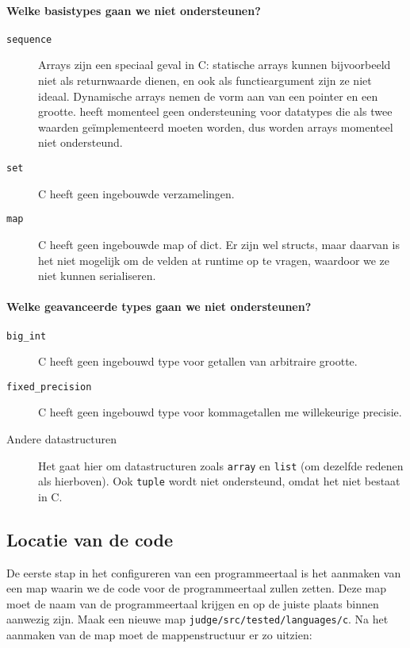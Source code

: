 \paragraph{Welke basistypes gaan we niet ondersteunen?}

\begin{description}
    \item[\texttt{sequence}] Arrays zijn een speciaal geval in C: statische arrays kunnen bijvoorbeeld niet als returnwaarde dienen, en ook als functieargument zijn ze niet ideaal.
    Dynamische arrays nemen de vorm aan van een pointer en een grootte. 
    \tested{} heeft momenteel geen ondersteuning voor datatypes die als twee waarden geïmplementeerd moeten worden, dus worden arrays momenteel niet ondersteund.
    \item[\texttt{set}] C heeft geen ingebouwde verzamelingen.
    \item[\texttt{map}] C heeft geen ingebouwde map of dict.
    Er zijn wel structs, maar daarvan is het niet mogelijk om de velden at runtime op te vragen, waardoor we ze niet kunnen serialiseren.
\end{description}

\paragraph{Welke geavanceerde types gaan we niet ondersteunen?}

\begin{description}
    \item[\texttt{big\_int}] C heeft geen ingebouwd type voor getallen van arbitraire grootte.
    \item[\texttt{fixed\_precision}] C heeft geen ingebouwd type voor
    kommagetallen me willekeurige precisie.
    \item[Andere datastructuren] Het gaat hier om datastructuren zoals \texttt{array} en \texttt{list} (om dezelfde redenen als hierboven).
    Ook \texttt{tuple} wordt niet ondersteund, omdat het niet bestaat in C\@.
\end{description}

\subsection{Locatie van de code}\label{subsec:locatie-van-de-code}

De eerste stap in het configureren van een programmeertaal is het aanmaken van een map waarin we de code voor de programmeertaal zullen zetten.
Deze map moet de naam van de programmeertaal krijgen en op de juiste plaats binnen \tested{} aanwezig zijn.
Maak een nieuwe map \texttt{judge/src/tested/languages/c}.
Na het aanmaken van de map moet de mappenstructuur er zo uitzien:

